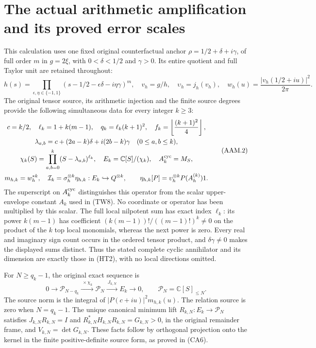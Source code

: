\section{The actual arithmetic amplification and its proved error scales}
\label{sec:arithmetic-amplification-match}

This calculation uses one fixed original counterfactual anchor
$\rho=1/2+\delta+i\gamma$, of full order $m$ in $g=2\xi$, with
$0<\delta<1/2$ and $\gamma>0$. Its entire quotient and full Taylor
unit are retained throughout:
\[
 h(s)=\prod_{\epsilon,\eta\in\{-1,1\}}
 (s-1/2-\epsilon\delta-i\eta\gamma)^m,
 \quad v_h=g/h,\quad \upsilon_h=j_h(v_h),\quad
 w_h(u)=\frac{|v_h(1/2+iu)|^2}{2\pi}.
 \tag{AAM.1}
\]
The original tensor source, its arithmetic injection and the finite
source degrees provide the following simultaneous data for every
integer $k\geq3$:
\[
 \begin{gathered}
 c=k/2,\quad \ell_k=1+k(m-1),\quad q_k=\ell_k(k+1)^2,\quad
 f_k=\left\lfloor\frac{(k+1)^2}{4}\right\rfloor,\\
 \lambda_{a,b}=c+(2a-k)\delta+i(2b-k)\gamma\quad(0\leq a,b\leq k),\\
 \chi_k(S)=\prod_{a,b=0}^k(S-\lambda_{a,b})^{\ell_k},\quad
 E_k=\mathbb C[S]/(\chi_k),\quad A_k^{\rm cyc}=M_S,\\
 m_{h,k}=w_h^{*k},\quad
 \mathcal I_k=\sigma_h^{\otimes k}\eta_{h,k}:E_k\hookrightarrow Q^{\otimes k},
 \qquad\eta_{h,k}[P]=\upsilon_h^{\otimes k}P(A_h^{(k)})1.
 \end{gathered}
 \tag{AAM.2}
\]
The superscript on $A_k^{\rm cyc}$ distinguishes this operator from
the scalar upper-envelope constant $A_k$ used in (TW8). No coordinate
or operator has been multiplied by this scalar.
The full local nilpotent sum has exact index $\ell_k$: its power
$k(m-1)$ has coefficient $(k(m-1))!/((m-1)!)^k\ne0$ on the product
of the $k$ top local monomials, whereas the next power is zero.
Every real and imaginary sign count occurs in the ordered tensor
product, and $\delta\gamma\ne0$ makes the displayed sums distinct.
Thus the stated complete cyclic annihilator and its dimension are
exactly those in (HT2), with no local directions omitted.

For $N\geq q_k-1$, the original exact sequence is
\[
 0\longrightarrow\mathcal P_{N-q_k}
 \xrightarrow{\ \times\chi_k\ }\mathcal P_N
 \xrightarrow{\ J_{k,N}\ }E_k\longrightarrow0,
 \qquad \mathcal P_N=\mathbb C[S]_{\leq N}.
 \tag{AAM.3}
\]
The source norm is the integral of $|P(c+iu)|^2m_{h,k}(u)$.
The relation source is zero when $N=q_k-1$. The unique canonical
minimum lift $R_{k,N}:E_k\to\mathcal P_N$ satisfies
$J_{k,N}R_{k,N}=I$ and $R_{k,N}^*H_{k,N}R_{k,N}=G_{k,N}>0$,
in the original remainder frame, and $V_{k,N}=\det G_{k,N}$.
These facts follow by orthogonal projection onto the kernel in the
finite positive-definite source form, as proved in (CA6).

